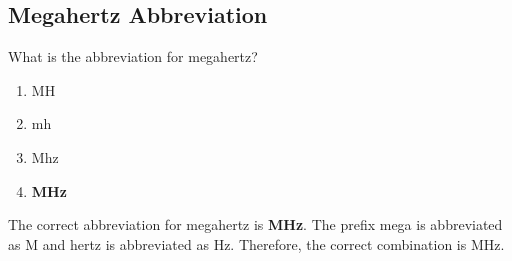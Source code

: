 \subsection{Megahertz Abbreviation}
\label{T5C07}

\begin{tcolorbox}[colback=gray!10!white,colframe=black!75!black,title=T5C07]
What is the abbreviation for megahertz?
\begin{enumerate}[noitemsep]
    \item MH
    \item mh
    \item Mhz
    \item \textbf{MHz}
\end{enumerate}
\end{tcolorbox}

The correct abbreviation for megahertz is \textbf{MHz}. The prefix mega is abbreviated as M and hertz is abbreviated as Hz. Therefore, the correct combination is MHz.